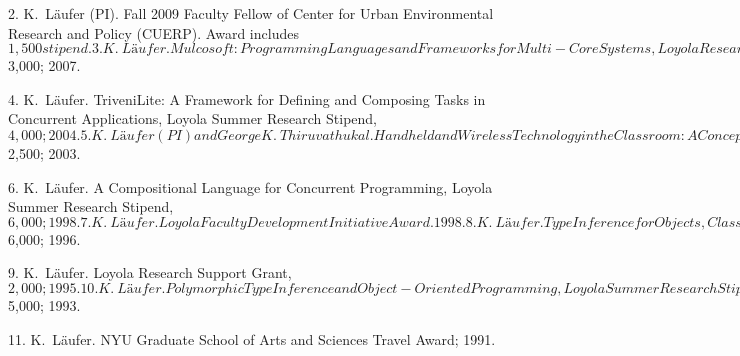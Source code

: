 2. K.\ Läufer (PI). Fall 2009 Faculty Fellow of Center for Urban Environmental Research and Policy (CUERP). Award includes $1,500 stipend.

3. K.\ Läufer. Mulcosoft: Programming Languages and Frameworks for Multi-Core Systems, Loyola Research Support Grant, $3,000; 2007.

4. K.\ Läufer. TriveniLite: A Framework for Defining and Composing Tasks in Concurrent Applications, Loyola Summer Research Stipend, $4,000; 2004.

5. K.\ Läufer (PI) and George K.\ Thiruvathukal. Handheld and Wireless Technology in the Classroom: A Concept/Research Laboratory for Teaching South Asian Languages, Loyola College of Arts and Sciences Research Seed Grant, $2,500; 2003.

6. K.\ Läufer. A Compositional Language for Concurrent Programming, Loyola Summer Research Stipend, $6,000; 1998.

7. K.\ Läufer. Loyola Faculty Development Initiative Award. 1998.

8. K.\ Läufer. Type Inference for Objects, Classes, and Patterns, Loyola Summer Research Stipend, $6,000; 1996.

9. K.\ Läufer. Loyola Research Support Grant, $2,000; 1995.

10. K.\ Läufer. Polymorphic Type Inference and Object-Oriented Programming, Loyola Summer Research Stipend, $5,000; 1993.

11. K.\ Läufer. NYU Graduate School of Arts and Sciences Travel Award; 1991.